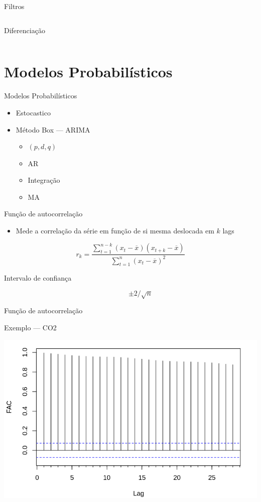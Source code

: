 \documentclass[compress,aspectratio=149,brazil]{beamer}
\begin{document}
\begin{frame}{Filtros}
\begin{columns}
\begin{column}{.5\textwidth}
\begin{block}{Diferenciação}
            \end{block}
        \end{column}
    \end{columns}
\end{frame}

\section{Modelos Probabilísticos}

\begin{frame}{Modelos Probabilísticos}
    \begin{itemize}
        \item Estocastico
        \item Método Box --- ARIMA
        \begin{itemize}
            \item $(p,d,q)$
            \item AR
            \item Integração
            \item MA
        \end{itemize}
    \end{itemize}
\end{frame}

\begin{frame}{Função de autocorrelação}
    \begin{itemize}
        \item Mede a correlação da série em função de si mesma deslocada em $k$
            lags
    \end{itemize}
    \[
    r_k = \frac{\sum_{t=1}^{n-k}{(x_t - \overline{x})(x_{t+k} -
    \overline{x})}}{\sum_{t=1}^{n}{(x_t - \overline{x})^2}}
    \]
    \begin{description}
        \item[Intervalo de confiança] \[\pm{}2/\sqrt{n}\]
    \end{description}
\end{frame}

\begin{frame}{Função de autocorrelação}
    \begin{block}{Exemplo --- CO2}
        \begin{center}
            \includegraphics[width=.8\textwidth]{../images/acf_co2.png}
        \end{center}
    \end{block}
\end{frame}
\end{document}
